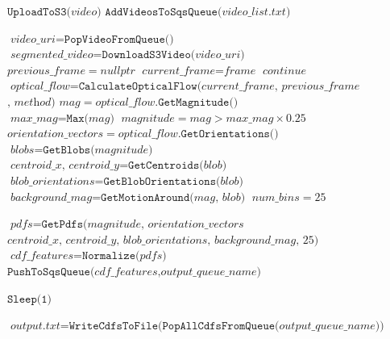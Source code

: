 \begin{figure}[h]
\begin{algorithmic}[1]

   
    \State $\texttt{UploadToS3(}\textit{video}\texttt{)}$
  \EndFor
  \State $\texttt{AddVideosToSqsQueue(}\textit{video\_list.txt}\texttt{)}$

  \State $\textit{video\_uri} = \texttt{PopVideoFromQueue()}$
  \State $\textit{segmented\_video} = \texttt{DownloadS3Video(}\textit{video\_uri}\texttt{)}$
  \State $\textit{previous\_frame} = nullptr$
   
    \State $\textit{current\_frame} = \textit{frame}$
      \State $continue$
    \EndIf
    \State $\textit{optical\_flow} = \texttt{CalculateOpticalFlow(}\textit{current\_frame, previous\_frame}$
    \Statex $\textit{, method} \texttt{)}$
    \State $\textit{mag} = \textit{optical\_flow}.\texttt{GetMagnitude()}$
    \State $\textit{max\_mag} = \texttt{Max(} \textit{mag} \texttt{)}$
    \State $\textit{magnitude} = \textit{mag} > \textit{max\_mag} \times 0.25$
    \State $\textit{orientation\_vectors} = \textit{optical\_flow}.\texttt{GetOrientations()}$
    \State $\textit{blobs} = \texttt{GetBlobs(} \textit{magnitude}\texttt{)}$
      \State $\textit{centroid\_x, centroid\_y} = \texttt{GetCentroids(} \textit{blob} \texttt{)}$
      \State $\textit{blob\_orientations} = \texttt{GetBlobOrientations(} \textit{blob} \texttt{)}$
      \State $\textit{background\_mag} = \texttt{GetMotionAround(} \textit{mag, blob} \texttt{)}$
    \EndFor
    \State $\textit{num\_bins} = 25$

    \State $\textit{pdfs} = \texttt{GetPdfs(} \textit{magnitude, orientation\_vectors} $
    \Statex $\textit{centroid\_x, centroid\_y, blob\_orientations, background\_mag, 25} \texttt{)}$
  \EndFor
  \State $\textit{cdf\_features} = \texttt{Normalize(}\textit{pdfs}\texttt{)}$
  \State $\texttt{PushToSqsQueue(}\textit{cdf\_features}, \textit{output\_queue\_name} \texttt{)}$

    \State $\texttt{Sleep(1)}$
  \EndWhile

  \State $\textit{output.txt} = \texttt{WriteCdfsToFile(PopAllCdfsFromQueue(}\textit{output\_queue\_name} \texttt{))}$


\end{algorithmic}
\end{figure}
